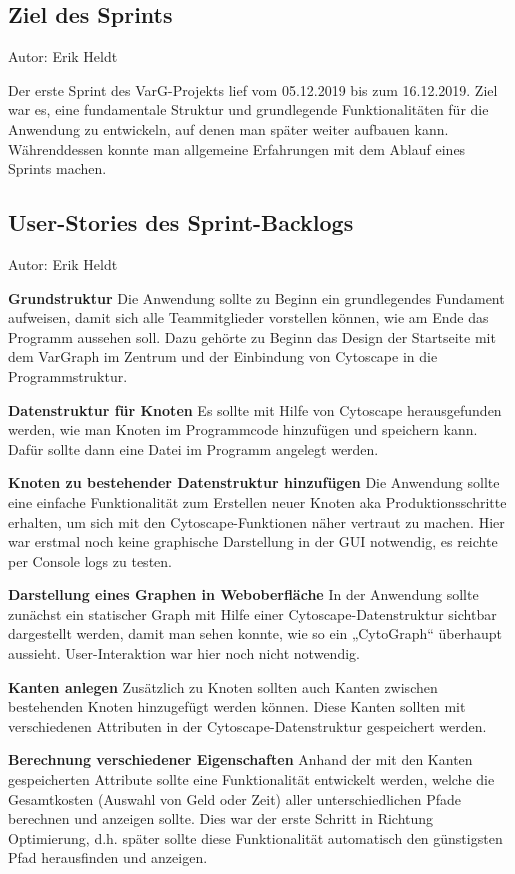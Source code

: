 
\subsection{Ziel des Sprints}
{\small Autor: Erik Heldt}

Der erste Sprint des VarG-Projekts lief vom 05.12.2019 bis zum 16.12.2019. Ziel war es, eine fundamentale Struktur und grundlegende Funktionalitäten für die Anwendung zu entwickeln, auf denen man später weiter aufbauen kann. Währenddessen konnte man allgemeine Erfahrungen mit dem Ablauf eines Sprints machen.

\subsection{User-Stories des Sprint-Backlogs}
{\small Autor: Erik Heldt}

\textbf{Grundstruktur}
Die Anwendung sollte zu Beginn ein grundlegendes Fundament aufweisen, damit sich alle Teammitglieder vorstellen können, wie am Ende das Programm aussehen soll. Dazu gehörte zu Beginn das Design der Startseite mit dem VarGraph im Zentrum und der Einbindung von Cytoscape in die Programmstruktur.

\textbf{Datenstruktur für Knoten}
Es sollte mit Hilfe von Cytoscape herausgefunden werden, wie man Knoten im Programmcode hinzufügen und speichern kann. Dafür sollte dann eine Datei im Programm angelegt werden.

\textbf{Knoten zu bestehender Datenstruktur hinzufügen}
Die Anwendung sollte eine einfache Funktionalität zum Erstellen neuer Knoten aka Produktionsschritte erhalten, um sich mit den Cytoscape-Funktionen näher vertraut zu machen. Hier war erstmal noch keine graphische Darstellung in der GUI notwendig, es reichte per Console logs zu testen.

\textbf{Darstellung eines Graphen in Weboberfläche}
In der Anwendung sollte zunächst ein statischer Graph mit Hilfe einer Cytoscape-Datenstruktur sichtbar dargestellt werden, damit man sehen konnte, wie so ein „CytoGraph“ überhaupt aussieht. User-Interaktion war hier noch nicht notwendig.

\textbf{Kanten anlegen}
Zusätzlich zu Knoten sollten auch Kanten zwischen bestehenden Knoten hinzugefügt werden können. Diese Kanten sollten mit verschiedenen Attributen in der Cytoscape-Datenstruktur gespeichert werden.

\textbf{Berechnung verschiedener Eigenschaften}
Anhand der mit den Kanten gespeicherten Attribute sollte eine Funktionalität entwickelt werden, welche die Gesamtkosten (Auswahl von Geld oder Zeit) aller unterschiedlichen Pfade berechnen und anzeigen sollte. Dies war der erste Schritt in Richtung Optimierung, d.h. später sollte diese Funktionalität automatisch den günstigsten Pfad herausfinden und anzeigen.


